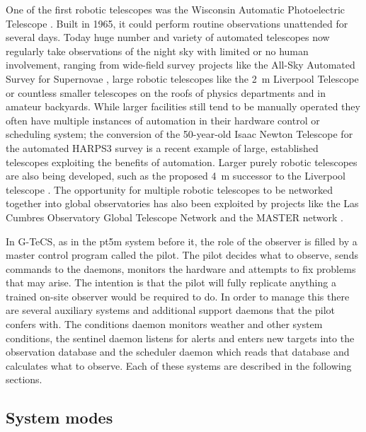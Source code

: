 \begin{colsection}
\begin{colsection}
One of the first robotic telescopes was the Wisconsin Automatic Photoelectric Telescope \citep{Wisconsin_APT}. Built in 1965, it could perform routine observations unattended for several days. Today huge number and variety of automated telescopes now regularly take observations of the night sky with limited or no human involvement, ranging from wide-field survey projects like the All-Sky Automated Survey for Supernovae  \citep[ASAS-SN,][]{ASAS-SN}, large robotic telescopes like the \SI{2}{\metre} Liverpool Telescope \citep{Liverpool} or countless smaller telescopes on the roofs of physics departments and in amateur backyards. While larger facilities still tend to be manually operated they often have multiple instances of automation in their hardware control or scheduling system; the conversion of the 50-year-old Isaac Newton Telescope for the automated HARPS3 survey \citep{INT_robotic} is a recent example of large, established telescopes exploiting the benefits of automation. Larger purely robotic telescopes are also being developed, such as the proposed \SI{4}{\metre} successor to the Liverpool telescope \citep{Liverpool2}. The opportunity for multiple robotic telescopes to be networked together into global observatories has also been exploited by projects like the Las Cumbres Observatory Global Telescope Network \citep{LCO} and the MASTER network \citep{MASTER}.

In G-TeCS, as in the pt5m system before it, the role of the observer is filled by a master control program called the pilot. The pilot decides what to observe, sends commands to the daemons, monitors the hardware and attempts to fix problems that may arise. The intention is that the pilot will fully replicate anything a trained on-site observer would be required to do. In order to manage this there are several auxiliary systems and additional support daemons that the pilot confers with. The conditions daemon monitors weather and other system conditions, the sentinel daemon listens for alerts and enters new targets into the observation database and the scheduler daemon which reads that database and calculates what to observe. Each of these systems are described in the following sections.

\end{colsection}



\subsection{System modes}
\label{sec:mode}
\begin{colsection}


\end{colsection}
\end{colsection}
